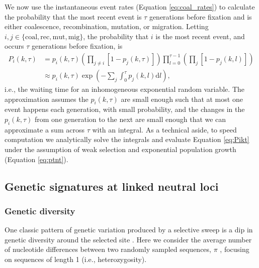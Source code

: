 \documentclass[]{article}
\begin{document}
We now use the instantaneous event rates (Equation \ref{eq:coal_rates}) to calculate the probability that the most recent event is $\tau$ generations before fixation and is either coalescence, recombination, mutation, or migration. 
Letting $i,j\in\{\mathrm{coal, rec, mut, mig}\}$, the probability that $i$ is the most recent event, and occurs $\tau$ generations before fixation, is \citep[c.f., equation 6 in][]{pennings2006soft}
\begin{equation}\label{eq:Pikt}
\begin{aligned}
P_i(k,\tau) &= p_{i}(k,\tau) \left( \prod_{j\neq i} [1 - p_{j}(k,\tau)] \right) \prod_{l=0}^{\tau-1} \left( \prod_{j} [1 - p_{j}(k,l)] \right)\\
&\approx p_{i}(k,\tau) \exp \left( -\sum_{j} \int_{0}^{\tau} p_{j}(k,l) \mathrm{d}l \right),
\end{aligned}
\end{equation}
i.e., the waiting time for an inhomogeneous exponential random variable.
The approximation assumes the $p_i(k,\tau)$ are small enough such that at most one event happens each generation, with small probability, and the changes in the $p_i(k,\tau)$ from one generation to the next are small enough that we can approximate a sum across $\tau$ with an integral.
As a technical aside, to speed computation we analytically solve the integrals and evaluate Equation \ref{eq:Pikt} under the assumption of weak selection and exponential population growth (Equation \ref{eq:ptnt}).

\subsection*{Genetic signatures at linked neutral loci}
\label{sec:rescue_signatures}

\subsubsection*{Genetic diversity}
\label{sec:rescue_heterozygosity}

One classic pattern of genetic variation produced by a selective sweep is a dip in genetic diversity around the selected site \citep{smith1974hitch,kaplan1989hitchhiking}. 
Here we consider the average number of nucleotide differences between two randomly sampled sequences, $\pi$ \citep{tajima1983evolutionary}, focusing on sequences of length 1 (i.e., heterozygosity).
\end{document}
